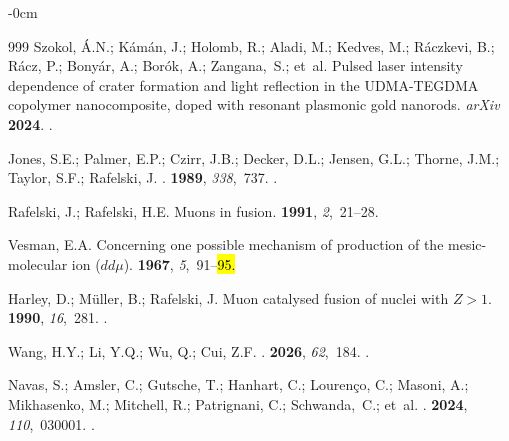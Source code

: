 \documentclass[particles,article,accept,pdftex,moreauthors]{Definitions/mdpi}
\begin{document}
\begin{adjustwidth}{-\extralength}{0cm}
\begin{thebibliography}{999}
Szokol, {\'A}.N.; Kámán, J.; Holomb, R.; Aladi, M.; Kedves, M.; Ráczkevi, B.; Rácz, P.; Bonyár, A.; Borók, A.; Zangana,~S.; et~al.
\newblock Pulsed laser intensity dependence of crater formation and light
  reflection in the UDMA-TEGDMA copolymer nanocomposite, doped with resonant
  plasmonic gold nanorods.
\newblock \emph{arXiv} \textbf{2024}.
.

Jones, S.E.; Palmer, E.P.;  Czirr, J.B.; Decker, D.L.; Jensen, G.L.; Thorne, J.M.; Taylor, S.F.; Rafelski, J.
.
 {\bf 1989}, {\em 338},~737.
.

Rafelski, J.; Rafelski, H.E.
\newblock Muons in fusion.
 {\bf 1991}, {\em 2},~21--28.

Vesman, E.A.
\newblock Concerning one possible mechanism of production of the
  mesic-molecular ion ($dd\mu$).
 {\bf 1967}, {\em 5},~91--\hl{95.} %



Harley, D.; M{\"u}ller, B.;  Rafelski, J.
\newblock Muon catalysed fusion of nuclei with \ensuremath{Z > 1}.
 {\bf 1990}, {\em 16},~281.
.

Wang, H.Y.; Li, Y.Q.;  Wu, Q.; Cui, Z.F.
.
 {\bf 2026}, {\em 62},~184.
.

Navas, S.;  Amsler, C.; Gutsche, T.; Hanhart, C.; Lourenço, C.; Masoni, A.; Mikhasenko, M.; Mitchell, R.; Patrignani, C.; Schwanda,~C.; et~al.
.
 {\bf 2024}, {\em 110},~030001.
.


\end{thebibliography}
\end{adjustwidth}
\end{document}
